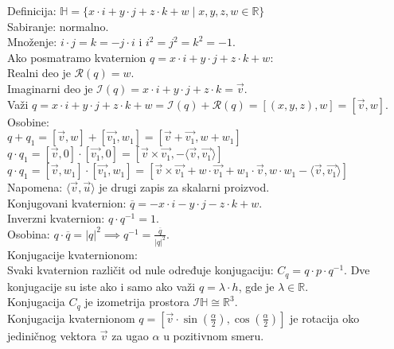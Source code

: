 \documentclass[12pt]{article}
\newcommand{\vek}[1]{\overrightarrow{#1}}
\begin{document}
Definicija: $\mathbb{H}=\{x\cdot i+y\cdot j+z\cdot k+w\mid x,y,z,w\in\mathbb{R}\}$\\
Sabiranje: normalno.\\
Množenje: $i\cdot j=k=-j\cdot i$ i $i^2=j^2=k^2=-1$.\\
Ako posmatramo kvaternion $q=x\cdot i +y\cdot j +z\cdot k+w$:\\
Realni deo je $\mathcal{R}(q)=w$.\\
Imaginarni deo je $\mathcal{I}(q)=x\cdot i +y\cdot j +z\cdot k=\vek{v}$.\\
Važi $q=x\cdot i +y\cdot j +z\cdot k+w=\mathcal{I}(q)+\mathcal{R}(q)=[(x,y,z),w]=[\vek{v},w]$.\\
Osobine:\\
$q+q_1=[\vek{v},w]+[\vek{v_1},w_1]=[\vek{v}+\vek{v_1},w+w_1]$\\
$q\cdot q_1=[\vek{v},0]\cdot[\vek{v_1},0]=[\vek{v}\times\vek{v_1},-\langle\vek{v},\vek{v_1}\rangle]$\\
$q\cdot q_1=[\vek{v},w_1]\cdot[\vek{v_1},w_1]=[\vek{v}\times\vek{v_1}+w\cdot \vek{v_1}+w_1\cdot\vek{v},w\cdot w_1-\langle\vek{v},\vek{v_1}\rangle]$\\
Napomena: $\langle\vek{v},\vek{u}\rangle$ je drugi zapis za skalarni proizvod.\\
Konjugovani kvaternion: $\overline{q}=-x\cdot i -y\cdot j -z\cdot k+w$.\\
Inverzni kvaternion: $q\cdot q^{-1}=1$.\\
Osobina: $q\cdot \overline{q}=|q|^2 \implies q^{-1}=\frac{\overline{q}}{|q|^2}$.\\
Konjugacije kvaternionom:\\
Svaki kvaternion različit od nule određuje konjugaciju: $C_q=q\cdot p \cdot q^{-1}$.
Dve konjugacije su iste ako i samo ako važi $q=\lambda\cdot h$, gde je $\lambda\in\mathbb{R}$.\\
Konjugacija $C_q$ je izometrija prostora $\mathcal{I}\mathbb{H}\cong\mathbb{R}^3$.\\
Konjugacija kvaternionom $q=[\vek{v}\cdot\sin(\frac{\alpha}{2}),\cos(\frac{\alpha}{2})]$
je rotacija oko jediničnog vektora $\vek{v}$
za ugao $\alpha$ u pozitivnom smeru.
\par
\end{document}
